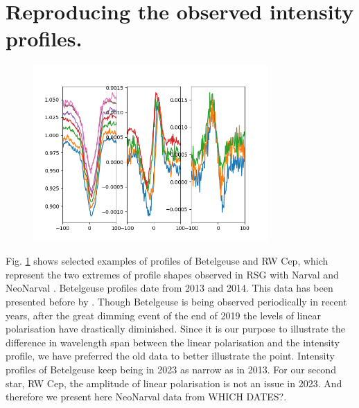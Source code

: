\documentclass{/Users/art2/TeX/aanda/aa}
\def\kms {km\,s$^{-1}$}
\begin{document}
\section{Reproducing the observed intensity profiles.}

\begin{figure}
   \includegraphics[width=0.8\textwidth]{RWCep.png}
   \caption{ }
   \label{observed}
   \end{figure}

Fig. \ref{observed} shows selected examples of profiles of Betelgeuse and RW Cep, which represent the two extremes of profile shapes 
observed in RSG with Narval and NeoNarval \cite[see][for a description of both instruments and the data reduction procedures]{LA,Donati}.
Betelgeuse profiles date from 2013 and 2014. This data has been presented before by \cite{Auriere}. Though Betelgeuse is being observed periodically 
in recent years, after the great dimming event of the end of 2019 the levels of linear polarisation have drastically diminished. Since 
it is our purpose to illustrate the difference in wavelength span between the linear polarisation and the intensity profile, we have 
preferred the old data to better illustrate the point. Intensity profiles of Betelgeuse keep being in 2023 as narrow as in 2013. For our 
second star, RW Cep, the amplitude of linear polarisation is not an issue in 2023. And therefore we present here NeoNarval data from 
WHICH DATES?. 
\end{document}
